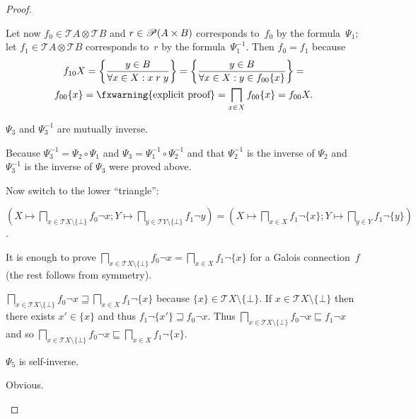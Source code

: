 \begin{proof}
\begin{claimproof}
Let now $f_{0}\in\mathscr{T}A\otimes\mathscr{T}B$ and $r\in\mathscr{P}(A\times B)$
corresponds to~$f_{0}$ by the formula~$\Psi_1$; let $f_{1}\in\mathscr{T}A\otimes\mathscr{T}B$
corresponds to~$r$ by the formula~$\Psi_1^{-1}$. Then $f_0=f_1$ because
\begin{multline*}
f_{10} X = \setcond{y\in B}{\forall x\in X:x\mathrel{r}y} = \setcond{y\in B}{\forall x\in X:y\in f_{00}\{x\}} = \\
f_{00}\{x\} = \text{\fxwarning{explicit proof}} = \bigsqcap_{x\in X}f_{00}\{x\} = f_{00}X.
\end{multline*}
\end{claimproof}

\begin{claim}
$\Psi_3$ and $\Psi_3^{-1}$ are mutually inverse.
\end{claim}
\begin{claimproof}
Because $\Psi_3^{-1} = \Psi_2\circ\Psi_1$ and $\Psi_3 = \Psi_1^{-1}\circ\Psi_2^{-1}$
and that $\Psi_2^{-1}$ is the inverse of $\Psi_2$ and $\Psi_3^{-1}$ is the inverse of $\Psi_3$ were proved above.
\end{claimproof}

Now switch to the lower ``triangle'':

\begin{flushleft}
\begin{claim}
$\left(X\mapsto\bigsqcap_{x\in\mathscr{T}X\setminus\{\bot\}}f_0\lnot x;Y\mapsto\bigsqcap_{y\in\mathscr{T}Y\setminus\{\bot\}}f_1\lnot y\right)=\left(X\mapsto\bigsqcap_{x\in X}f_1\lnot\{x\};Y\mapsto\bigsqcap_{y\in Y}f_1\lnot\{y\}\right)$.
\end{claim}
\end{flushleft}
\begin{claimproof}
It is enough to prove $\bigsqcap_{x\in\mathscr{T}X\setminus\{\bot\}}f_0\lnot x = \bigsqcap_{x\in X}f_1\lnot\{x\}$ for a Galois connection~$f$
(the rest follows from symmetry).

$\bigsqcap_{x\in\mathscr{T}X\setminus\{\bot\}}f_0\lnot x \sqsupseteq \bigsqcap_{x\in X}f_1\lnot\{x\}$ because $\{x\}\in\mathscr{T}X\setminus\{\bot\}$.
If $x\in\mathscr{T}X\setminus\{\bot\}$ then there exists $x'\in\{x\}$ and thus $f_1\lnot\{x'\}\sqsupseteq f_0\lnot x$. Thus
$\bigsqcap_{x\in\mathscr{T}X\setminus\{\bot\}}f_0\lnot x \sqsubseteq f_1\lnot x$ and so
$\bigsqcap_{x\in\mathscr{T}X\setminus\{\bot\}}f_0\lnot x \sqsubseteq \bigsqcap_{x\in X}f_1\lnot\{x\}$.
\end{claimproof}

\begin{claim}
$\Psi_5$ is self-inverse.
\end{claim}
\begin{claimproof}
Obvious.
\end{claimproof}


\end{proof}
